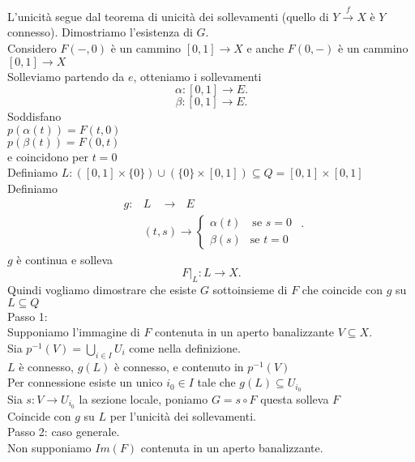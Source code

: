 \documentclass[12px]{article}
\begin{document}
\begin{dimo}
	L'unicità segue dal teorema di unicità dei sollevamenti (quello di $Y \xrightarrow{f} X$ è $Y$ connesso). Dimostriamo l'esistenza di $G$.\\
	Considero  $F(-,0)$ è un cammino  $[0,1] \rightarrow X$ e anche $F(0,-)$ è un cammino  $[0,1] \rightarrow X$ \\
	Solleviamo partendo da $e$, otteniamo i sollevamenti\\
	\[
		\alpha: [0,1] \rightarrow E
	.\] 
	\[
		\beta :[0,1] \rightarrow E
	.\] 
	Soddisfano \\
	$p(\alpha(t)) = F(t,0)$\\
	$p (\beta(t)) = F(0,t)$ \\
	e coincidono per $t =0 $ \\
	Definiamo $L: ([0,1]\times\{0\} ) \cup (\{0\}\times [0,1])\subseteq Q = [0,1]\times[0,1]$\\
	Definiamo\\
	 \[
	\begin{aligned}
		g: &L \ \ \ \ \rightarrow \ \ \ E\\
		   & (t,s) \rightarrow \begin{cases}
		   \alpha(t) \ \ \ \text { se } s = 0\\
			   \beta(s) \ \ \text{ se } t = 0
		   \end{cases}
	\end{aligned}
	.\] 
	$g$ è continua e solleva\\
	\[
	F|_L : L \rightarrow X
	.\] 
	Quindi vogliamo dimostrare che esiste $G$ sottoinsieme di $F$ che coincide con $g$ su $L\subseteq Q$\\
	Passo 1:\\
	Supponiamo l'immagine di  $F$ contenuta in un aperto banalizzante $V \subseteq X.$\\
	Sia $p^{-1}(V) = \bigcup_{i \in I}U_i$ come nella definizione.\\
 $L$ è connesso, $g(L)$ è connesso, e contenuto in $p^{-1}(V)$ \\
 Per connessione esiste un unico $i_0\in I$ tale che $g(L)\subseteq U_{i_0}$\\
 Sia $s: V \rightarrow U_{i_0}$ la sezione locale, poniamo $G = s\circ F$ questa solleva  $F$\\
  Coincide con $g$ su  $L$ per l'unicità dei sollevamenti. \\
 Passo 2: caso generale.\\
 Non supponiamo $Im(F)$ contenuta in un aperto banalizzante.\\

\end{dimo}
\end{document}
